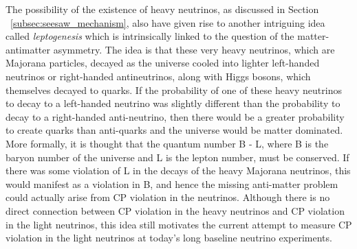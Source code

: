 The possibility of the existence of heavy neutrinos, as discussed in  Section ~\ref{subsec:seesaw_mechanism}, also have given rise to another intriguing idea called \textit{leptogenesis} which is intrinsically linked to the question of the matter-antimatter asymmetry. The idea is that these very heavy neutrinos, which are Majorana particles, decayed as the universe cooled into lighter left-handed neutrinos or right-handed antineutrinos, along with Higgs bosons, which themselves decayed to quarks. If the probability of one of these heavy neutrinos to decay to a left-handed neutrino was slightly different than the probability to decay to a right-handed anti-neutrino, then there would be a greater probability to create quarks than anti-quarks and the universe would be matter dominated. More formally, it is thought that the quantum number B - L, where B is the baryon number of the universe and L is the lepton number, must be conserved. If there was some violation of L in the decays of the heavy Majorana neutrinos, this would manifest as a violation in B, and hence the missing anti-matter problem could actually arise from CP violation in the neutrinos. Although there is no direct connection between CP violation in the heavy neutrinos and CP violation in the light neutrinos, this idea still motivates the current attempt to measure CP violation in the light neutrinos at today’s long baseline neutrino experiments.
